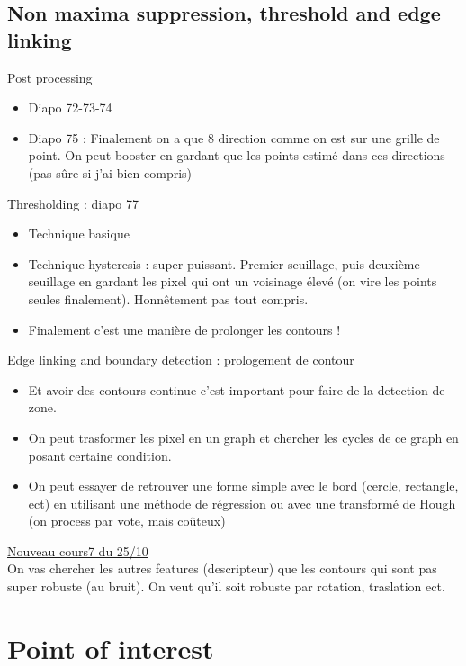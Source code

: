 \documentclass{article}
\theoremstyle{plain}%
\theoremstyle{definition}
\theoremstyle{remark}
\begin{document}
\subsection{Non maxima suppression, threshold and edge linking}
Post processing
\begin{itemize}
    \item Diapo 72-73-74
    \item Diapo 75 : Finalement on a que 8 direction comme on est sur une grille de point. On peut booster en gardant que les points estimé dans ces directions (pas sûre si j'ai bien compris)
\end{itemize}
Thresholding : diapo 77
\begin{itemize}
    \item Technique basique 
    \item Technique hysteresis : super puissant. Premier seuillage, puis deuxième seuillage en gardant les pixel qui ont un voisinage élevé (on vire les points seules finalement). Honnêtement pas tout compris.
    \item Finalement c'est une manière de prolonger les contours ! 
\end{itemize}
Edge linking and boundary detection : prologement de contour
\begin{itemize}
    \item Et avoir des contours continue c'est important pour faire de la detection de zone.
    \item On peut trasformer les pixel en un graph et chercher les cycles de ce graph en posant certaine condition. 
    \item On peut essayer de retrouver une forme simple avec le bord (cercle, rectangle, ect) en utilisant une méthode de régression ou avec une transformé de Hough (on process par vote, mais coûteux)
\end{itemize}


\underline{Nouveau cours7 du 25/10} \\
On vas chercher les autres features (descripteur) que les contours qui sont pas super robuste (au bruit). On veut qu'il soit robuste par rotation, traslation ect.

\section{Point of interest}
\end{document}
